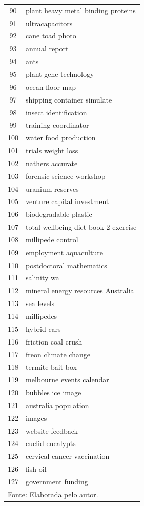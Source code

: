 \begin{center}
\begin{longtable}{c|p{6cm}}
90 & plant heavy metal binding proteins \\
91 & ultracapacitors \\
92 & cane toad photo \\
93 & annual report \\
94 & ants \\
95 & plant gene technology \\
96 & ocean floor map \\
97 & shipping container simulate \\
98 & insect identification \\
99 & training coordinator \\
100 & water food production \\
101 & trials weight loss \\
102 & nathers accurate \\
103 & forensic science workshop \\
104 & uranium reserves \\
105 & venture capital investment \\
106 & biodegradable plastic \\
107 & total wellbeing diet book 2 exercise \\
108 & millipede control \\
109 & employment aquaculture \\
110 & postdoctoral mathematics \\
111 & salinity wa \\
112 & mineral energy resources Australia \\
113 & sea levels \\
114 & millipedes \\
115 & hybrid cars \\
116 & friction coal crush \\
117 & freon climate change \\
118 & termite bait box \\
119 & melbourne events calendar \\
120 & bubbles ice image \\
121 & australia population \\
122 & images \\
123 & website feedback \\
124 & euclid eucalypts \\
125 & cervical cancer vaccination \\
126 & fish oil \\
127 & government funding \\


\hline
\hline \multicolumn{2}{l}{Fonte: Elaborada pelo autor.}

\end{longtable}
\end{center}



